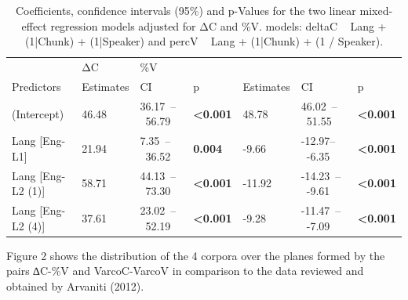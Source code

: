\begin{table}
\caption{Coefficients, confidence intervals (95\%) and p-Values for the two
linear mixed-effect regression models adjusted for ΔC and \%V. models: deltaC ~
Lang + (1|Chunk) + (1|Speaker) and percV ~ Lang + (1|Chunk) + (1 /
Speaker).}\label{leo-tab02}
\begin{small}
\begin{tabular}{@{}lllllll@{}}
\toprule
  & ΔC & \%V & & & & \\
Predictors & Estimates & CI & p & Estimates & CI & p \\
\midrule
(Intercept) & 46.48 & 36.17~--~56.79 & \textbf{\textless0.001} & 48.78 & 46.02~--~51.55 & \textbf{\textless0.001} \\
Lang {[}Eng-L1{]} & 21.94 & 7.35~--~36.52 & \textbf{0.004} & -9.66 & -12.97--~-6.35 & \textbf{\textless0.001} \\
Lang {[}Eng-L2 (1){]} & 58.71 & 44.13~--~73.30 & \textbf{\textless0.001} & -11.92 & -14.23~--~-9.61 & \textbf{\textless0.001} \\
Lang {[}Eng-L2 (4){]} & 37.61 & 23.02~--~52.19 & \textbf{\textless0.001}& -9.28 & -11.47~--~-7.09 & \textbf{\textless0.001} \\
\bottomrule
\end{tabular}
\end{small}
\end{table}


Figure 2 shows the distribution of the 4 corpora over the planes formed by the
pairs ∆C-\%V and VarcoC-VarcoV in comparison to the data reviewed and obtained
by Arvaniti (2012). 

